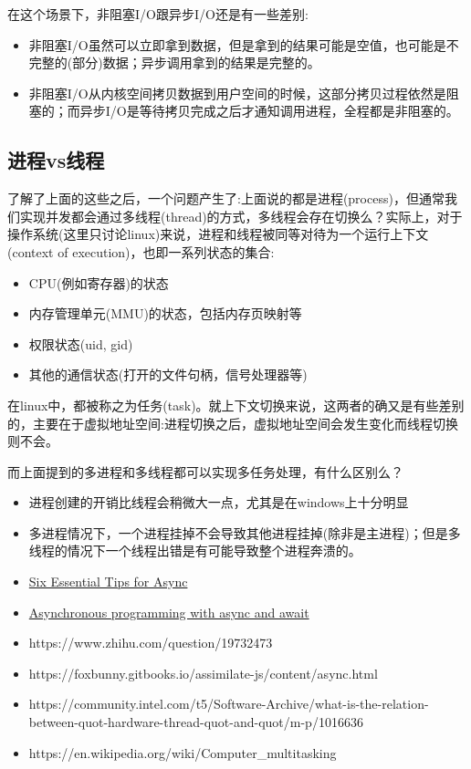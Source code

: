 \documentclass[12pt]{article}
\begin{document}
在这个场景下，非阻塞I/O跟异步I/O还是有一些差别:

\begin{itemize}
\tightlist
\item
  非阻塞I/O虽然可以立即拿到数据，但是拿到的结果可能是空值，也可能是不完整的(部分)数据；异步调用拿到的结果是完整的。
\item
  非阻塞I/O从内核空间拷贝数据到用户空间的时候，这部分拷贝过程依然是阻塞的；而异步I/O是等待拷贝完成之后才通知调用进程，全程都是非阻塞的。
\end{itemize}

\subsection{进程vs线程}\label{ux8fdbux7a0bvsux7ebfux7a0b}

了解了上面的这些之后，一个问题产生了:上面说的都是进程(process)，但通常我们实现并发都会通过多线程(thread)的方式，多线程会存在切换么？实际上，对于操作系统(这里只讨论linux)来说，进程和线程被同等对待为一个运行上下文(context of execution)，也即一系列状态的集合:

\begin{itemize}
\tightlist
\item
  CPU(例如寄存器)的状态
\item
  内存管理单元(MMU)的状态，包括内存页映射等
\item
  权限状态(uid, gid)
\item
  其他的通信状态(打开的文件句柄，信号处理器等)
\end{itemize}

在linux中，都被称之为任务(task)。就上下文切换来说，这两者的确又是有些差别的，主要在于虚拟地址空间:进程切换之后，虚拟地址空间会发生变化而线程切换则不会。

而上面提到的多进程和多线程都可以实现多任务处理，有什么区别么？

\begin{itemize}
\item
  进程创建的开销比线程会稍微大一点，尤其是在windows上十分明显
\item
  多进程情况下，一个进程挂掉不会导致其他进程挂掉(除非是主进程)；但是多线程的情况下一个线程出错是有可能导致整个进程奔溃的。
\item
  \href{https://channel9.msdn.com/Series/Three-Essential-Tips-for-Async}{Six Essential Tips for Async}
\item
  \href{https://docs.microsoft.com/en-us/dotnet/csharp/programming-guide/concepts/async/}{Asynchronous programming with async and await}
\item
  https://www.zhihu.com/question/19732473
\item
  https://foxbunny.gitbooks.io/assimilate-js/content/async.html
\item
  https://community.intel.com/t5/Software-Archive/what-is-the-relation-between-quot-hardware-thread-quot-and-quot/m-p/1016636
\item
  https://en.wikipedia.org/wiki/Computer\_multitasking
\end{itemize}
\end{document}
